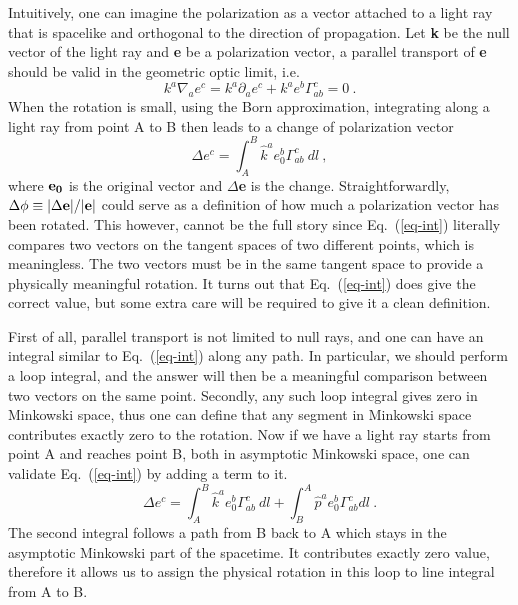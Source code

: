 \documentclass[aps,showpacs,twocolumn,floats,prd,superscriptaddress,nofootinbib]{revtex4}
\begin{document}
Intuitively, one can imagine the polarization as a vector attached to a light ray that is spacelike and orthogonal to the direction of propagation. 
Let {\bf k} be the null vector of the light ray and {\bf e} be a polarization vector, a parallel transport of {\bf e} should be valid in the geometric optic limit, i.e.
\begin{equation}
k^a \nabla_a e^c = k^a \partial_a e^c + k^a e^b \Gamma_{ab}^c =0~.
\label{eq-para}
\end{equation}
When the rotation is small, using the Born approximation, integrating along a light ray from point A to B then leads to a change of polarization vector
\begin{equation}
\Delta e^c = \int_A^B \hat{k}^a e_0^b \Gamma_{ab}^c~dl~,
\label{eq-int}
\end{equation}
where ${\bf e_0}$ is the original vector and $\Delta${\bf e} is the change. 
Straightforwardly, $\Delta \phi \equiv |\Delta {\bf e}|/|{\bf e}|$ could serve as a definition of how much a polarization vector has been rotated.
This however, cannot be the full story since Eq.~(\ref{eq-int}) literally compares two vectors on the tangent spaces of two different points, which is meaningless. 
The two vectors must be in the same tangent space to provide a physically meaningful rotation. 
It turns out that Eq.~(\ref{eq-int}) does give the correct value, but some extra care will be required to give it a clean definition.

First of all, parallel transport is not limited to null rays, and one can have an integral similar to Eq.~(\ref{eq-int}) along any path. 
In particular, we should perform a loop integral, and the answer will then be a meaningful comparison between two vectors on the same point. 
Secondly, any such loop integral gives zero in Minkowski space, thus one can define  that any segment in Minkowski space contributes exactly zero to the rotation. 
Now if we have a light ray starts from point A and reaches point B, both in asymptotic Minkowski space, one can validate Eq.~(\ref{eq-int}) by adding a term to it.
\begin{equation}
\Delta e^c = \int_A^B \hat{k}^a e_0^b \Gamma_{ab}^c~dl +
 \int_B^A \hat{p}^a e_0^b \Gamma_{ab}^c dl~.
\label{eq-loop}
\end{equation}
The second integral follows a path from B back to A which stays in the asymptotic Minkowski part of the spacetime. 
It contributes exactly zero value, therefore it allows us to assign the physical rotation in this loop to line integral from A to B.
\end{document}
